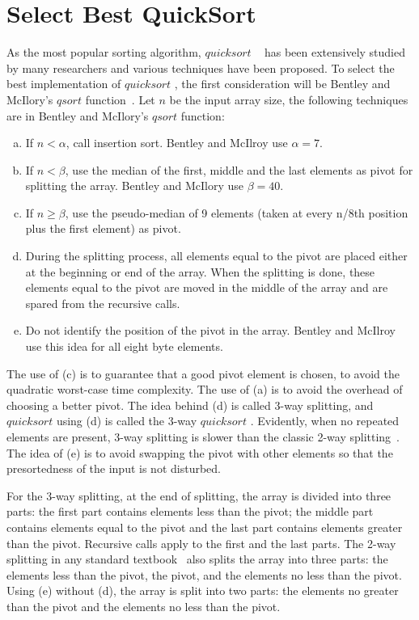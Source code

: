 \documentclass[AMA,STIX1COL]{WileyNJD-v2}
\newcommand{\qusort}{$quicksort$ }
\newcommand{\qsort}{$qsort$ }
\begin{document}
\section{Select Best QuickSort}       
As the most popular sorting algorithm, \qusort~\cite{hoare1961algorithm} has been extensively studied by many researchers and various techniques have been proposed. 
To select the best implementation of \qusort, the first consideration will be Bentley and McIlory’s \qsort function~\cite{bentley1993engineering}. 
Let $n$ be the input array size, the following techniques are in Bentley and McIlory’s \qsort function: 

\begin{enumerate}[(a)]
\item If $n < \alpha$, call insertion sort. Bentley and McIlroy use $\alpha = 7$.
\item If $n < \beta$, use the median of the first, middle and the last elements as pivot for splitting the array. Bentley and McIlory use $\beta = 40$.
\item If $n \geq \beta$, use the pseudo-median of 9 elements (taken at every n/8th position plus the first element) as pivot.
\item During the splitting process, all elements equal to the pivot are placed either at the beginning or end of the array. When the splitting is done, these elements equal to the pivot are moved in the middle of the array and are spared from the recursive calls.
\item Do not identify the position of the pivot in the array. Bentley and McIlroy use this idea for all eight byte elements.
\end{enumerate}

The use of (c) is to guarantee that a good pivot element is chosen, to avoid the quadratic worst-case time complexity.  
The use of (a) is to avoid the overhead of choosing a better pivot. The idea behind (d) is called 3-way splitting, and \qusort using (d) is called the 3-way \qusort. 
Evidently, when no repeated elements are present, 3-way splitting is slower than the classic 2-way splitting~\cite{10.5555/1614191}. 
The idea of (e) is to avoid swapping the pivot with other elements so that the presortedness of the input is not disturbed. 

For the 3-way splitting, at the end of splitting, the array is divided into three parts: the first part contains elements less than the pivot; the middle part contains elements equal to the pivot and the last part contains elements greater than the pivot. 
Recursive calls apply to the first and the last parts. 
The 2-way splitting in any standard textbook~\cite{10.5555/1614191} also splits the array into three parts: the elements less than the pivot, the pivot, and the elements no less than the pivot. 
Using (e) without (d), the array is split into two parts: the elements no greater than the pivot and the elements no less than the pivot. 
\end{document}
